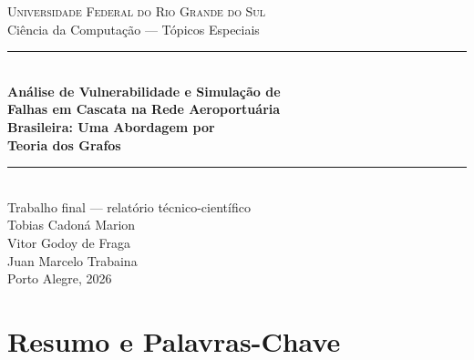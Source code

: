 \documentclass[12pt,a4paper]{article}
\begin{document}
\thispagestyle{empty}
\begin{center}
  \vspace*{1cm}
  {\large\scshape\color{cinza} Universidade Federal do Rio Grande do Sul}\\[4pt]
  {\normalsize\color{cinza} Ciência da Computação --- Tópicos Especiais}\\[2cm]

  {\color{azul}\rule{\linewidth}{2pt}}\\[0.6cm]
  {\LARGE\bfseries\color{azul}
    Análise de Vulnerabilidade e Simulação de\\[6pt]
    Falhas em Cascata na Rede Aeroportuária\\[6pt]
    Brasileira: Uma Abordagem por\\[6pt]
    Teoria dos Grafos
  }\\[0.6cm]
  {\color{azul}\rule{\linewidth}{2pt}}\\[1cm]

  {\normalsize\color{cinza} Trabalho final --- relatório técnico-científico}\\[2cm]

  {\large Tobias Cadoná Marion}\\[4pt]
  {\large Vitor Godoy de Fraga}\\[4pt]
  {\large Juan Marcelo Trabaina}\\[3cm]

  {\normalsize\color{cinza} Porto Alegre, 2026}
\end{center}

\newpage
\tableofcontents
\newpage

\section{Resumo e Palavras-Chave}
\end{document}

